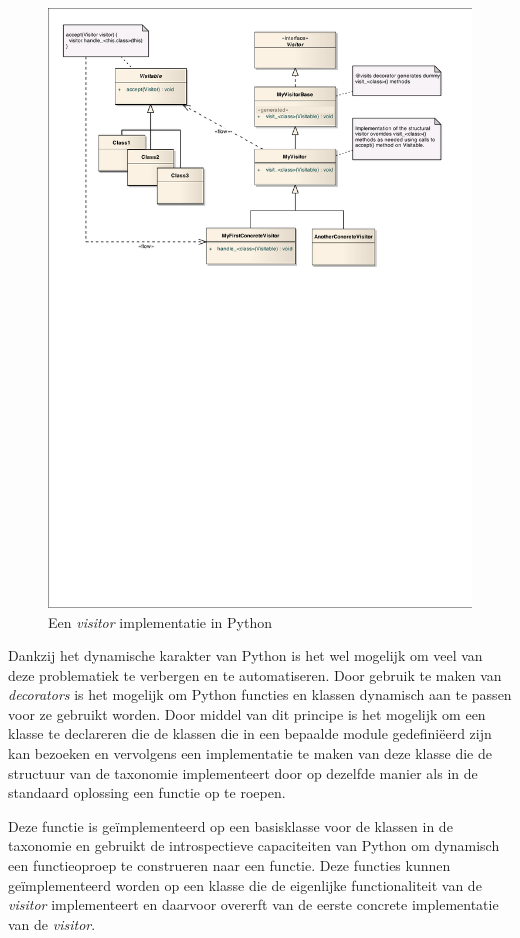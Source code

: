 \begin{figure}[ht]
  \centering
  \includegraphics[width=0.9\linewidth]{resources/py-visitor.pdf}
  \caption{Een \emph{visitor} implementatie in Python}
  \label{fig:py-visitor}
\end{figure}

Dankzij het dynamische karakter van Python is het wel mogelijk om veel
van deze problematiek te verbergen en te automatiseren. Door gebruik te maken
van \emph{decorators} is het mogelijk om Python functies en klassen dynamisch
aan te passen voor ze gebruikt worden. Door middel van dit principe is het
mogelijk om een klasse te declareren die de klassen die in een bepaalde module
gedefini\"eerd zijn kan bezoeken en vervolgens een implementatie te maken van
deze klasse die de structuur van de taxonomie implementeert door op dezelfde
manier als in de standaard oplossing een  functie op te roepen.

Deze  functie is ge\"implementeerd op een basisklasse voor de
klassen in de taxonomie en gebruikt de introspectieve capaciteiten van Python
om dynamisch een functieoproep te construeren naar een 
functie. Deze functies kunnen ge\"implementeerd worden op een klasse die de
eigenlijke functionaliteit van de \emph{visitor} implementeert en daarvoor
overerft van de eerste concrete implementatie van de \emph{visitor}.

